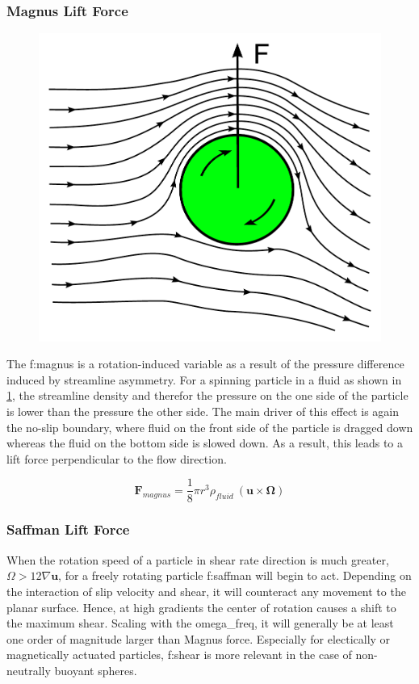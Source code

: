 \subsubsection{Magnus Lift Force}
\vspace{\baselineskip}
\begin{figure}[h!]
	\centering
	\includegraphics[width=0.6\linewidth]{./Ressources/Fluidic/Magnus-effect.pdf}
	\label{fig:fluidic:magnus}
\end{figure}
The \gls{f:magnus} is a rotation-induced variable as a result of the pressure difference induced by streamline asymmetry.\cite{lit:fluidic:inertialFluidicsForces} For a spinning particle in a fluid as shown in \cref{fig:fluidic:magnus}, the streamline density and therefor the pressure on the one side of the particle is lower than the pressure the other side. The main driver of this effect is again the no-slip boundary, where fluid on the front side of the particle is dragged down whereas the fluid on the bottom side is slowed down. As a result, this leads to a lift force perpendicular to the flow direction.

\begin{equation}	
	\mathbf{F}_{magnus} =  \frac{1}{8}\pi r^3 \rho_{fluid} \ ( \mathbf{u} \times \mathbf{\Omega}) \label{eq:f:magnus}
\end{equation}


\subsubsection{Saffman Lift Force}
When the rotation speed of a particle in shear rate direction is much greater, $\Omega>12\nabla\mathbf{u}$, for a freely rotating particle \gls{f:saffman} will begin to act. Depending on the interaction of slip velocity and shear, it will counteract any movement to the planar surface. Hence, at high gradients the center of rotation causes a shift to the maximum shear. \newline 
Scaling with the \gls{omega_freq}, it will generally be at least one order of magnitude larger than Magnus force. Especially for electically or magnetically actuated particles, \gls{f:shear} is more relevant in the case of non-neutrally buoyant spheres.\cite{lit:fluidic:inertialFluidicsForces} 


